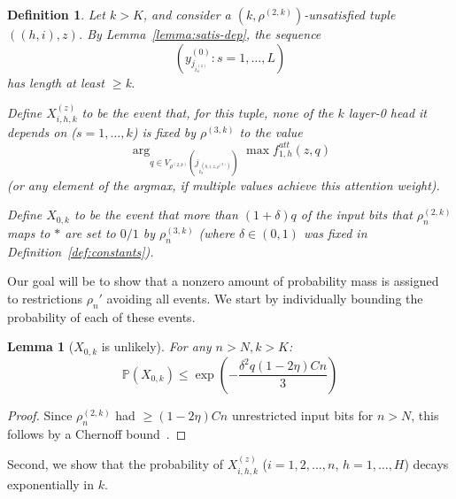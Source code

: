 \documentclass[11pt,letterpaper]{article}
\newcommand{\Prob}[0]{\mathbb{P}}
\newcounter{theorem}
\newtheorem{defin}[theorem]{Definition}
\newtheorem{lemma}[theorem]{Lemma}
\begin{document}
\begin{defin}
Let $k > K$, and consider a $(k, \rho^{(2,k)})$-unsatisfied tuple $((h,i),z)$.
By Lemma~\ref{lemma:satis-dep}, the sequence
\begin{equation}
\left(   y_{j_{i_s^{(z)}}}^{(0)} : s=1, \dots, L   \right)
\end{equation}
has length at least $\geq $k.

Define $X_{i,h,k}^{(z)}$ to be the event that, for this tuple, none of the $k$ layer-0 head it depends on ($s = 1, \dots, k$) is fixed by $\rho^{(3,k)}$ to the value
\begin{equation}
    \arg_{q \in V_{\rho^{(2,k)}}(j_{i_s^{(h,i,z,\rho^{(2)})}})} \max f^{att}_{1,h}(z, q)
\end{equation}
(or any element of the argmax, if multiple values achieve this attention weight).

Define $X_{0,k}$ to be the event that more than $(1+\delta)q$ of the input bits that $\rho_n^{(2,k)}$ maps to $*$ are set to $0/1$ by $\rho_n^{(3,k)}$ (where $\delta \in (0,1)$ was fixed in Definition~\ref{def:constants}).
\end{defin}



Our goal will be to show that a nonzero amount of probability mass is assigned to restrictions $\rho_n'$ avoiding all events.
We start by individually bounding the probability of each of these events.

\begin{lemma}[$X_{0,k}$ is unlikely]
For any $n > N, k > K$:
\begin{equation}
\Prob(X_{0,k}) \leq    \exp\left(-\frac{\delta^2q(1-2\eta)Cn}{3}\right)
\end{equation}
\end{lemma}

\begin{proof}
Since $\rho_n^{(2,k)}$ had $\geq (1-2\eta)Cn$ unrestricted input bits for $n > N$, this follows by a Chernoff bound~\cite[Theorem 4.4]{mitzenmacherprobability}.
\end{proof}

Second, we show that the probability of $X_{i,h,k}^{(z)}$ ($i=1,2,\dots, n$, $h=1, \dots, H$) decays exponentially in $k$.
\end{document}
